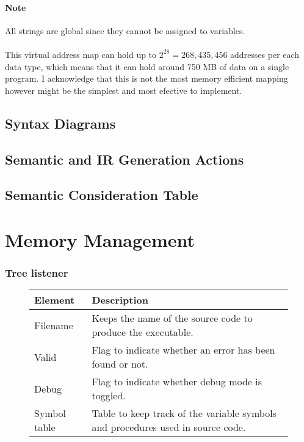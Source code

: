 \paragraph{Note} All strings are global since they cannot be assigned to
variables.

\paragraph{} This virtual address map can hold up to $2^{28} = 268,435,456$
addresses per each data type, which means that it can hold around 750 MB of
data on a single program. I acknowledge that this is not the most memory
efficient mapping however might be the simplest and most efective to
implement.

\newpage

\subsection{Syntax Diagrams}
\subsection{Semantic and IR Generation Actions}
\subsection{Semantic Consideration Table}

\section{Memory Management}
\subsubsection{Tree listener}
\begin{figure}[h]
    \centering
    \begin{tabular}{p{1in}p{3in}}
        \toprule
        \textbf{Element} & \textbf{Description}\\
        \midrule Filename &
        Keeps the name of the source code to produce the executable.\\

        \midrule Valid &
        Flag to indicate whether an error has been found or not.\\

        \midrule Debug &
        Flag to indicate whether debug mode is toggled.\\

        \midrule Symbol table &
        Table to keep track of the variable symbols and procedures used in
        source code.\\

        \bottomrule
    \end{tabular}\\
\end{figure}
